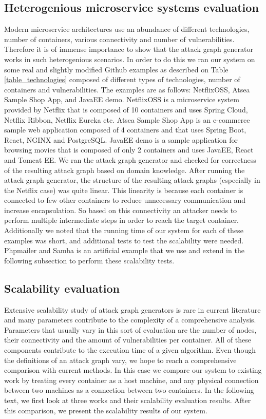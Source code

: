 \subsection{Heterogenious microservice systems evaluation}
\label{chap:heterogenious_systems}
Modern microservice architectures use an abundance of different technologies, number of containers, various connectivity and number of vulnerabilities. Therefore it is of immense importance to show that the attack graph generator works in such heterogenious scenarios. In order to do this we ran our system on some real and slightly modified Github examples as described on Table \ref{table_technologies} composed of different types of technologies, number of containers and vulnerabilities. The examples are as follows: NetflixOSS, Atsea Sample Shop App, and JavaEE demo. NetflixOSS is a microservice system provided by Netflix that is composed of 10 containers and uses Spring Cloud, Netflix Ribbon, Netflix Eureka etc. Atsea Sample Shop App is an e-commerce sample web application composed of 4 containers and that uses Spring Boot, React, NGINX and PostgreSQL. JavaEE demo is a sample application for browsing movies that is composed of only 2 containers and uses JavaEE, React and Tomcat EE. We ran the attack graph generator and checked for correctness of the resulting attack graph based on domain knowledge. After running the attack graph generator, the structure of the resulting attack graphs (especially in the Netflix case) was quite linear. This linearity is because each container is connected to few other containers to reduce unnecessary communication and increase encapsulation. So based on this connectivity an attacker needs to perform multiple intermediate steps in order to reach the target container. Additionally we noted that the running time of our system for each of these examples was short, and additional tests to test the scalability were needed. Phpmailer and Samba is an artificial example that we use and extend in the following subsection to perform these scalability tests.
	

\subsection{Scalability evaluation}
\label{chap:scalability_eval}
Extensive scalability study of attack graph generators  is rare in current literature and many parameters contribute to the complexity of a comprehensive analysis. Parameters that usually vary in this sort of evaluation are the number of nodes, their connectivity and the amount of vulnerabilities per container. All of these components contribute to the execution time of a given algorithm. Even though the definitions of an attack graph vary, we hope to reach a comprehensive comparison with current methods. In this case we compare our system to existing work by treating every container as a host machine, and any physical connection between two machines as a connection between two containers. In the following text, we first look at three works and their scalability evaluation results. After this comparison, we present the scalability results of our system.

